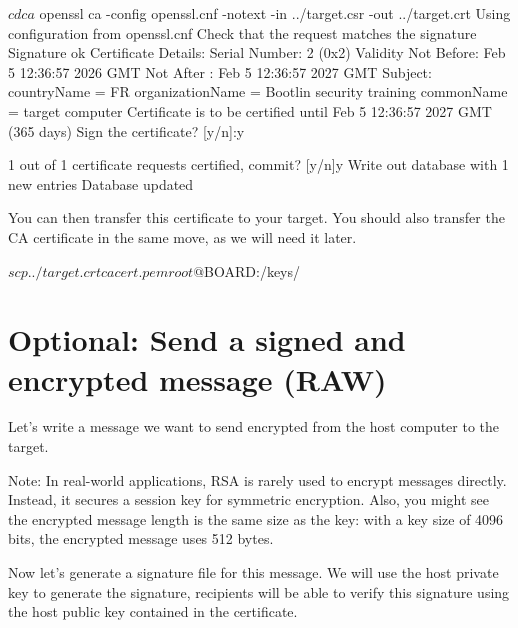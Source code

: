 \begin{bashinput}
$ cd ca
$ openssl ca -config openssl.cnf -notext -in ../target.csr -out ../target.crt
Using configuration from openssl.cnf
Check that the request matches the signature
Signature ok
Certificate Details:
        Serial Number: 2 (0x2)
        Validity
            Not Before: Feb  5 12:36:57 2026 GMT
            Not After : Feb  5 12:36:57 2027 GMT
        Subject:
            countryName               = FR
            organizationName          = Bootlin security training
            commonName                = target computer
Certificate is to be certified until Feb  5 12:36:57 2027 GMT (365 days)
Sign the certificate? [y/n]:y


1 out of 1 certificate requests certified, commit? [y/n]y
Write out database with 1 new entries
Database updated
\end{bashinput}

You can then transfer this certificate to your target.
You should also transfer the CA certificate in the same move, as we will need it
later.

\begin{bashinput}
$ scp ../target.crt cacert.pem root@${BOARD}:/keys/
\end{bashinput}

\section{Optional: Send a signed and encrypted message (RAW)}

Let's write a message we want to send encrypted from the host computer to the target.


Note: In real-world applications, RSA is rarely used to encrypt messages
directly.
Instead, it secures a session key for symmetric encryption.
Also, you might see the encrypted message length is the same size as the key: with a key size
of 4096 bits, the encrypted message uses 512 bytes.

Now let's generate a signature file for this message. We will use the host
private key to generate the signature, recipients will be able to verify this
signature using the host public key contained in the certificate.

